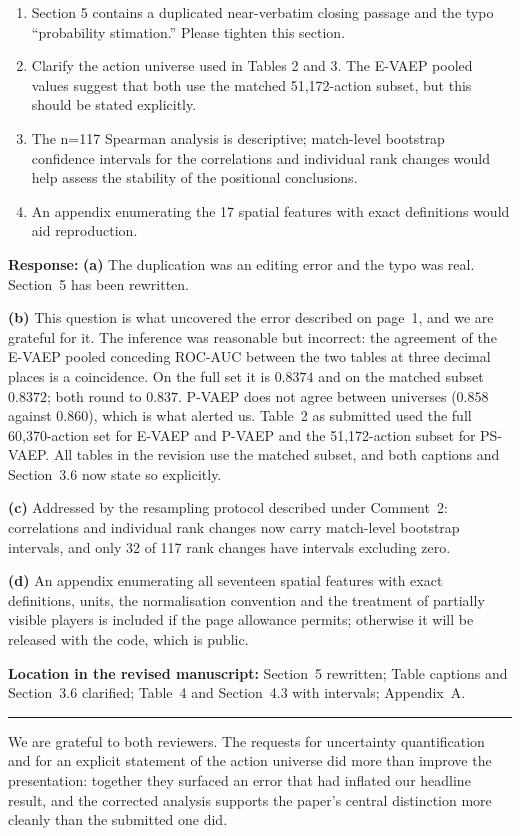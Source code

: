 \documentclass[11pt,a4paper]{article}
\newcommand{\response}[2]{%
  \begin{responsebox}
  \textbf{Response:}
  #1
  \end{responsebox}
  \begin{locationbox}
  \textbf{Location in the revised manuscript:}
  #2
  \end{locationbox}
}
\begin{document}
\begin{reviewbox}
\begin{enumerate}[label=\alph*)]
  \item Section 5 contains a duplicated near-verbatim closing passage and the typo ``probability stimation.'' Please tighten this section.
  \item Clarify the action universe used in Tables 2 and 3. The E-VAEP pooled values suggest that both use the matched 51,172-action subset, but this should be stated explicitly.
  \item The n=117 Spearman analysis is descriptive; match-level bootstrap confidence intervals for the correlations and individual rank changes would help assess the stability of the positional conclusions.
  \item An appendix enumerating the 17 spatial features with exact definitions would aid reproduction.
\end{enumerate}
\end{reviewbox}
\response{\textbf{(a)} The duplication was an editing error and the typo was real. Section~5 has been rewritten.

\textbf{(b)} This question is what uncovered the error described on page~1, and we are grateful for it. The inference was reasonable but incorrect: the agreement of the E-VAEP pooled conceding ROC-AUC between the two tables at three decimal places is a coincidence. On the full set it is $0.8374$ and on the matched subset $0.8372$; both round to $0.837$. P-VAEP does not agree between universes ($0.858$ against $0.860$), which is what alerted us. Table~2 as submitted used the full 60{,}370-action set for E-VAEP and P-VAEP and the 51{,}172-action subset for PS-VAEP. All tables in the revision use the matched subset, and both captions and Section~3.6 now state so explicitly.

\textbf{(c)} Addressed by the resampling protocol described under Comment~2: correlations and individual rank changes now carry match-level bootstrap intervals, and only 32 of 117 rank changes have intervals excluding zero.

\textbf{(d)} An appendix enumerating all seventeen spatial features with exact definitions, units, the normalisation convention and the treatment of partially visible players is included if the page allowance permits; otherwise it will be released with the code, which is public.}{Section~5 rewritten; Table captions and Section~3.6 clarified; Table~4 and Section~4.3 with intervals; Appendix~A.}

\vspace{4mm}
\hrule
\vspace{3mm}
We are grateful to both reviewers. The requests for uncertainty quantification and for an
explicit statement of the action universe did more than improve the presentation: together
they surfaced an error that had inflated our headline result, and the corrected analysis
supports the paper's central distinction more cleanly than the submitted one did.
\end{document}
